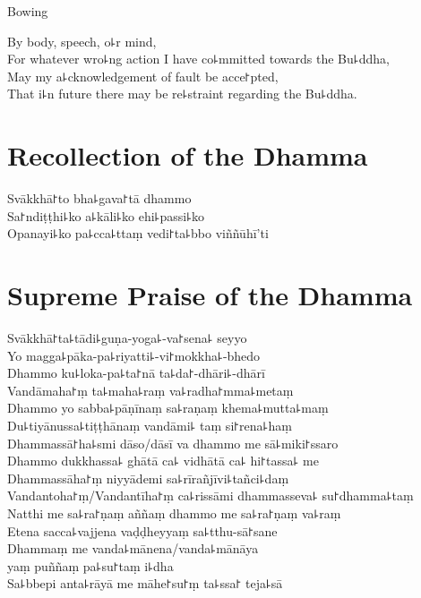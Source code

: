 \begin{instruction}
  Bowing
\end{instruction}

By body, speech, o꜕r mind,\\
For whatever wro꜕ng action I have co꜕mmitted towards the Bu꜕ddha,\\
May my a꜕cknowledgement of fault be acce꜓pted,\\
That i꜕n future there may be re꜕straint regarding the Bu꜕ddha.

\clearpage

\chPali
\chapter{Recollection of the Dhamma}%

\begin{leader}
\end{leader}

Svākkhā꜓to bha꜕gava꜓tā dhammo\\
Sa꜓ndiṭṭhi꜕ko a꜕kāli꜕ko ehi꜕passi꜕ko\\
Opanayi꜕ko pa꜕cca꜕ttaṃ vedi꜓ta꜕bbo viññūhī'ti


\chPali
\chapter{Supreme Praise of the Dhamma}%

\begin{leader}
\end{leader}

Svākkhā꜓ta꜕tādi꜕guṇa-yoga꜕-va꜓sena꜕ seyyo\\
Yo magga꜕pāka-pa꜕riyatti꜕-vi꜓mokkha꜕-bhedo\\
Dhammo ku꜕loka-pa꜕ta꜓nā ta꜕da꜓-dhāri꜕-dhārī\\
Vandāmaha꜓ṃ ta꜕maha꜕raṃ va꜕radha꜓mma꜕metaṃ\\
Dhammo yo sabba꜕pāṇīnaṃ sa꜕raṇaṃ khema꜕mutta꜕maṃ\\
Du꜕tiyānussa꜕tiṭṭhānaṃ vandāmi꜕ taṃ si꜓rena꜕haṃ\\
Dhammassā꜓ha꜕smi dāso/dāsī va dhammo me sā꜕miki꜓ssaro\\
Dhammo dukkhassa꜕ ghātā ca꜕ vidhātā ca꜕ hi꜓tassa꜕ me\\
Dhammassāha꜓ṃ niyyādemi sa꜕rīrañjīvi꜕tañci꜕daṃ\\
Vandantoha꜓ṃ/Vandantīha꜓ṃ ca꜕rissāmi dhammasseva꜕ su꜓dhamma꜕taṃ\\
Natthi me sa꜕ra꜓ṇaṃ aññaṃ dhammo me sa꜕ra꜓ṇaṃ va꜕raṃ\\
Etena sacca꜕vajjena vaḍḍheyyaṃ sa꜕tthu-sā꜓sane\\
Dhammaṃ me vanda꜕mānena/vanda꜕mānāya\\
\vin yaṃ puññaṃ pa꜕su꜓taṃ i꜕dha\\
Sa꜕bbepi anta꜕rāyā me māhe꜓su꜓ṃ ta꜕ssa꜓ teja꜕sā

